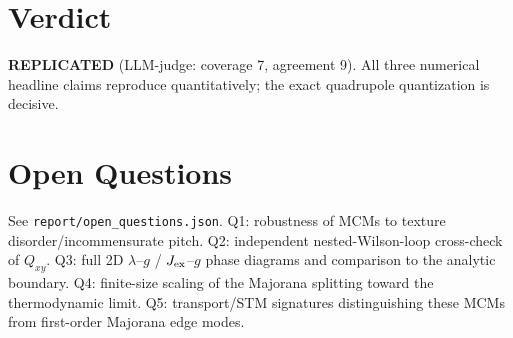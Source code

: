 \documentclass[11pt]{article}
\begin{document}
\section{Verdict}
\textbf{REPLICATED} (LLM-judge: coverage 7, agreement 9). All three numerical headline claims
reproduce quantitatively; the exact quadrupole quantization is decisive.

\section{Open Questions}
See \texttt{report/open\_questions.json}. Q1: robustness of MCMs to texture disorder/incommensurate
pitch. Q2: independent nested-Wilson-loop cross-check of $Q_{xy}$. Q3: full 2D $\lambda$--$g$ /
$J_{\rm ex}$--$g$ phase diagrams and comparison to the analytic boundary. Q4: finite-size scaling of
the Majorana splitting toward the thermodynamic limit. Q5: transport/STM signatures distinguishing
these MCMs from first-order Majorana edge modes.
\end{document}
